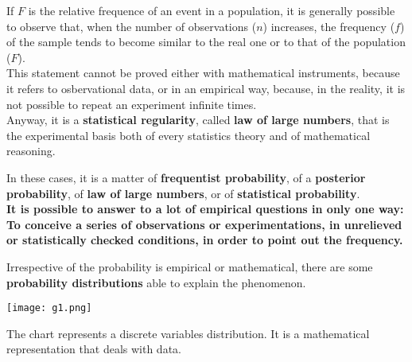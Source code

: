 \begin{frame}
  \vspace*{.25cm}
  If {\boldmath $ F $} is the relative frequence of an event in a population, it is generally possible to observe that, when the number of observations ({\boldmath $ n $}) increases, the  frequency ({\boldmath $ f $}) of the sample tends to become similar to the real one or to that of the population ({\boldmath $ F $}).\\
  \vspace*{.25cm}
  This statement cannot be proved either with mathematical instruments, because it refers to osbervational data, or in an empirical way, because, in the reality, it is not possible to repeat an experiment infinite times.\\
  \vspace*{.25cm}
  Anyway, it is a \textbf{statistical regularity}, called \textbf{law of large numbers}, that is the experimental basis both of every statistics theory and of mathematical reasoning.
\end{frame}

\begin{frame}
  \vspace*{.25cm}
  In these cases, it is a matter of \textbf{frequentist probability}, of a \textbf{posterior probability}, of \textbf{law of large numbers}, or of \textbf{statistical probability}.\\
  \vspace*{.4cm}
  \textbf{It is possible to answer to a lot of empirical questions in only one way:} \\
  \vspace*{.2cm}
  \textbf{To conceive a series of observations or experimentations, in unrelieved or statistically checked conditions, in order to point out the frequency.}
\end{frame}




\begin{frame}
  Irrespective of the probability is empirical or mathematical, there are some \textbf{probability distributions} able to explain the phenomenon.
  \begin{center}
    \texttt{[image: g1.png]}
  \end{center}
  The chart represents a discrete variables distribution. It is a mathematical representation that deals with data. 
\end{frame}

